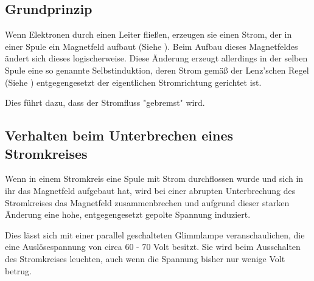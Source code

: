 \subsection{Grundprinzip}

Wenn Elektronen durch einen Leiter fließen, erzeugen sie einen Strom, der in einer Spule ein Magnetfeld aufbaut (Siehe ). Beim Aufbau dieses Magnetfeldes ändert sich dieses logischerweise. Diese Änderung erzeugt allerdings in der selben Spule eine so genannte Selbstinduktion, deren Strom gemäß der Lenz'schen Regel (Siehe ) entgegengesetzt der eigentlichen Stromrichtung gerichtet ist.

Dies führt dazu, dass der Stromfluss "gebremst" wird.

\subsection{Verhalten beim Unterbrechen eines Stromkreises}

Wenn in einem Stromkreis eine Spule mit Strom durchflossen wurde und sich in ihr das Magnetfeld aufgebaut hat, wird bei einer abrupten Unterbrechung des Stromkreises das Magnetfeld zusammenbrechen und aufgrund dieser starken Änderung eine hohe, entgegengesetzt gepolte Spannung induziert.

Dies lässt sich mit einer parallel geschalteten Glimmlampe veranschaulichen, die eine Auslösespannung von circa 60 - 70 Volt besitzt. Sie wird beim Ausschalten des Stromkreises leuchten, auch wenn die Spannung bisher nur wenige Volt betrug.
